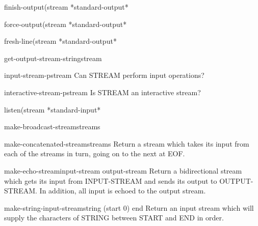 \begin{function}{finish-output}{\op (stream *standard-output*}{}
  
\end{function}

\begin{function}{force-output}{\op (stream *standard-output*}{}
  
\end{function}

\begin{function}{fresh-line}{\op (stream *standard-output*}{}
  
\end{function}

\begin{function}{get-output-stream-string}{stream}{}
  
\end{function}

\begin{function}{input-stream-p}{stream}{}
  Can STREAM perform input operations?
\end{function}

\begin{function}{interactive-stream-p}{stream}{}
  Is STREAM an interactive stream?
\end{function}

\begin{function}{listen}{\op (stream *standard-input*}{}
  
\end{function}

\begin{function}{make-broadcast-stream}{\rest streams}{}
  
\end{function}

\begin{function}{make-concatenated-stream}{\rest streams}{}
  Return a stream which takes its input from each of the streams in turn,
   going on to the next at EOF.
\end{function}

\begin{function}{make-echo-stream}{input-stream output-stream}{}
  Return a bidirectional stream which gets its input from INPUT-STREAM and
   sends its output to OUTPUT-STREAM. In addition, all input is echoed to
   the output stream.
\end{function}

\begin{function}{make-string-input-stream}{string \op (start 0) end}{}
  Return an input stream which will supply the characters of STRING between
  START and END in order.
\end{function}

